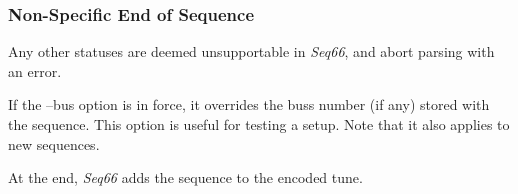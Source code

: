 \subsubsection{Non-Specific End of Sequence}
\label{subsubsec:midi_format_meta_sequence_ends}

   Any other statuses are deemed unsupportable in \textsl{Seq66}, and
   abort parsing with an error.

   If the --bus option is in force, it overrides the buss number (if any)
   stored with the sequence.  This option is useful for testing a setup.
   Note that it also applies to new sequences.

   At the end, \textsl{Seq66} adds the sequence to the encoded tune.

